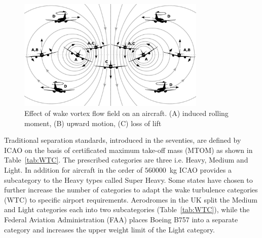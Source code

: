 \begin{figure}[h]
    \centering
    \includegraphics[width=0.8\textwidth]{graphics/reaction_in_wake.jpg}
    \caption[Wake vortex encounter]{Effect of wake vortex flow field on an aircraft. (A) induced rolling moment, (B) upward motion, (C) loss of lift~\cite[p.~33]{Hallock2018Apr}} \label{fig:vortex_encounter}
\end{figure}

Traditional separation standards, introduced in the seventies, are defined by ICAO  on the basis of certificated maximum take-off mass (MTOM) as shown in Table~\ref{tab:WTC}. The prescribed categories are three i.e. Heavy, Medium and Light. In addition for aircraft in the order of $560000$~kg ICAO provides a subcategory to the Heavy types called Super Heavy. Some states have chosen to further increase the number of categories to adapt the wake turbulence categories (WTC) to specific airport requirements. Aerodromes in the UK split the Medium and Light categories each into two subcategories (Table~\ref{tab:WTC}), while the Federal Aviation Administration (FAA) places Boeing B757 into a separate category and increases the upper weight limit of the Light category.~\cite{icao_wtc, uk_aeronautical_information_services_wake_2017, noauthor_recat_2018}

